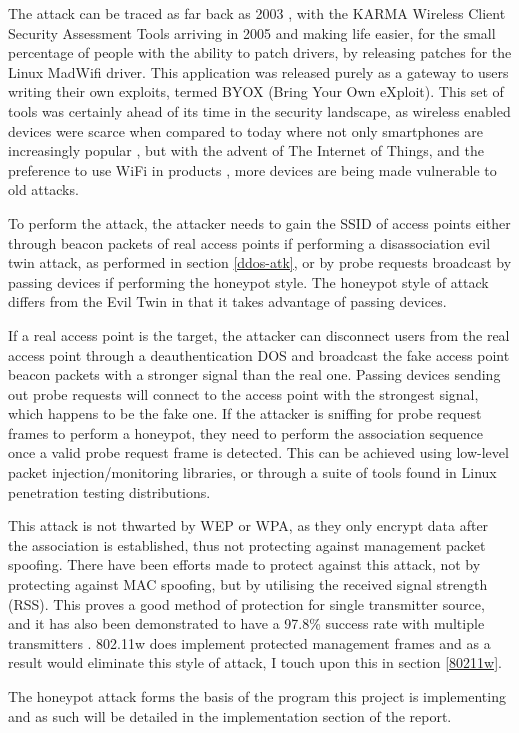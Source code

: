 The attack can be traced as far back as 2003 \cite{research:old_paper}, with the KARMA Wireless Client Security Assessment Tools \cite{research:old_toos} arriving in 2005 and making life easier, for the small percentage of people with the ability to patch drivers, by releasing patches for the Linux MadWifi driver. This application was released purely as a gateway to users writing their own exploits, termed BYOX (Bring Your Own eXploit). This set of tools was certainly ahead of its time in the security landscape, as wireless enabled devices were scarce when compared to today where not only smartphones are increasingly popular \cite{research:device_survey}, but with the advent of The Internet of Things, and the preference to use WiFi in products \cite{research:use_wifi}\cite{research:use_wifi2}, more devices are being made vulnerable to old attacks.  

To perform the attack, the attacker needs to gain the SSID of access points either through beacon packets of real access points if performing a disassociation evil twin attack, as performed in section \ref{ddos-atk}, or by probe requests broadcast by passing devices if performing the honeypot style. The honeypot style of attack differs from the Evil Twin in that it takes advantage of passing devices. 

If a real access point is the target, the attacker can disconnect users from the real access point through a deauthentication DOS and broadcast the fake access point beacon packets with a stronger signal than the real one. Passing devices sending out probe requests will connect to the access point with the strongest signal, which happens to be the fake one. If the attacker is sniffing for probe request frames to perform a honeypot, they need to perform the association sequence once a valid probe request frame is detected. This can be achieved using low-level packet injection/monitoring libraries, or through a suite of tools found in Linux penetration testing distributions.  

This attack is not thwarted by WEP or WPA, as they only encrypt data after the association is established, thus not protecting against management packet spoofing. There have been efforts made to protect against this attack, not by protecting against MAC spoofing, but by utilising the received signal strength (RSS). This proves a good method of protection for single transmitter source, and it has also been demonstrated to have a 97.8\% success rate with multiple transmitters \cite{4509834}. 802.11w does implement protected management frames and as a result would eliminate this style of attack, I touch upon this in section \ref{80211w}.

The honeypot attack forms the basis of the program this project is implementing and as such will be detailed in the implementation section of the report.